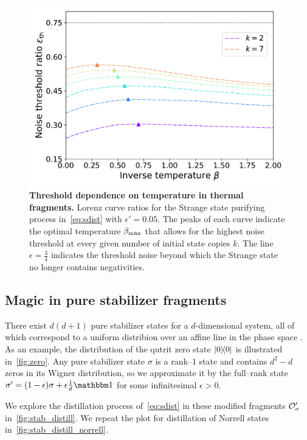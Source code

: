 \documentclass[pra,
aps,
twocolumn,
superscriptaddress,
groupedaddress,
nofootinbib,
reprint
]{revtex4-1}
\begin{document}
\begin{figure}[h]
    \centering
    \includegraphics[scale=0.5]{figs/thermal_distill.pdf}
    \caption{\textbf{Threshold dependence on temperature in thermal fragments.} Lorenz curve ratios for the Strange state purifying process in~\cref{eq:sdist} with $\epsilon' = 0.05$.
    The peaks of each curve indicate the optimal temperature $\beta_{\rm{max}}$ that allows for the highest noise threshold at every given number of initial state copies $k$.
    The line $\epsilon = \frac{3}{4}$ indicates the threshold noise beyond which the Strange state no longer contains negativities.
    }
    \label{fig:thermal_distill}
\end{figure}

\subsection{Magic in pure stabilizer fragments}\label{sec:magstab}

There exist $d(d+1)$ pure stabilizer states for a $d$-dimensional system, all of which correspond to a uniform distribion over an affine line in the phase space .
As an example, the distribution of the qutrit zero state $\ketbra{0}$ is illustrated in~\cref{fig:zero}.
Any pure stabilizer state $\sigma$ is a rank--$1$ state and contains $d^2 - d$ zeros in its Wigner distribution, so we approximate it by the full--rank state $\sigma' = (1-\epsilon)\sigma + \epsilon \frac{1}{d}\id$ for some infinitesimal $\epsilon > 0$.

We explore the distillation process of~\cref{eq:sdist} in these modified fragments $\mathcal{O}_\sigma'$ in~\cref{fig:stab_distill}.
We repeat the plot for distillation of Norrell states in~\cref{fig:stab_distill_norrell}.
\end{document}
